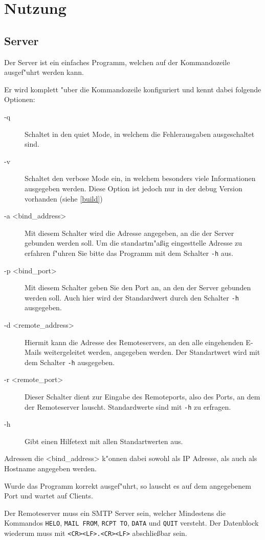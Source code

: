 \documentclass[pdftex,final,a4paper,10pt,notitlepage,halfparskip]{scrreprt}
\begin{document}
\chapter{Nutzung}
\section{Server}
Der Server ist ein einfaches Programm, welchen auf der Kommandozeile ausgef"{u}hrt werden kann.

Er wird komplett "{u}ber die Kommandozeile konfiguriert und kennt dabei folgende Optionen:
\begin{description}
  \item[-q] Schaltet in den quiet Mode, in welchem die Fehlerausgaben ausgeschaltet sind.
  \item[-v] Schaltet den verbose Mode ein, in welchem besonders viele Informationen ausgegeben werden. Diese Option ist jedoch nur in der debug Version vorhanden (siehe \ref{build})
  \item[-a <bind\_address>] Mit diesem Schalter wird die Adresse angegeben, an die der Server gebunden werden soll. Um die standartm"{a}ßig eingesttelle Adresse zu erfahren f"{u}hren Sie bitte das Programm mit dem Schalter \texttt{-h} aus. 
  \item[-p <bind\_port>] Mit diesem Schalter geben Sie den Port an, an den der Server gebunden werden soll. Auch hier wird der Standardwert durch den Schalter \texttt{-h} ausgegeben.
  \item[-d <remote\_address>] Hiermit kann die Adresse des Remoteservers, an den alle eingehenden E-Mails weitergeleitet werden, angegeben werden. Der Standartwert wird mit dem Schalter \texttt{-h} ausgegeben.
  \item[-r <remote\_port>] Dieser Schalter dient zur Eingabe des Remoteports, also des Ports, an dem der Remoteserver lauscht. Standardwerte sind mit \texttt{-h} zu erfragen.
  \item[-h] Gibt einen Hilfetext mit allen Standartwerten aus. 
\end{description}
Adressen die <bind\_address> k"{o}nnen dabei sowohl als IP Adresse, als auch als Hostname angegeben werden.

Wurde das Programm korrekt ausgef"{u}hrt, so lauscht es auf dem angegebenem Port und wartet auf Clients.

Der Remoteserver muss ein SMTP Server sein, welcher Mindestens die Kommandos \texttt{HELO}, \texttt{MAIL FROM}, \texttt{RCPT TO}, \texttt{DATA} und \texttt{QUIT} versteht. Der Datenblock wiederum muss mit \texttt{<CR><LF>.<CR><LF>} abschließbar sein.
\end{document}
